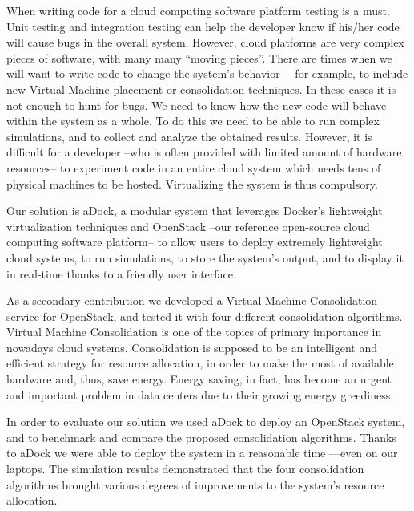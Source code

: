 \begin{spacing}{1}
When writing code for a cloud computing software platform testing is a must. Unit testing and integration testing can help the developer know if his/her code will cause bugs in the overall system. However, cloud platforms are very complex pieces of software, with many many ``moving pieces''. There are times when we will want to write code to change the system's behavior ---for example, to include new Virtual Machine placement or consolidation techniques. In these cases it is not enough to hunt for bugs. We need to know how the new code will behave within the system as a whole. To do this we need to be able to run complex simulations, and to collect and analyze the obtained results. However, it is difficult for a developer --who is often provided with limited amount of hardware resources-- to experiment code in an entire cloud system which needs tens of physical machines to be hosted. Virtualizing the system is thus compulsory.

Our solution is aDock, a modular system that leverages Docker's lightweight virtualization techniques and OpenStack --our reference open-source cloud computing software platform-- to allow users to deploy extremely lightweight cloud systems, to run simulations, to store the system's output, and to display it in real-time thanks to a friendly user interface.

As a secondary contribution we developed a Virtual Machine Consolidation service for OpenStack, and tested it with four different consolidation algorithms. Virtual Machine Consolidation is one of the topics of primary importance in nowadays cloud systems. Consolidation is supposed to be an intelligent and efficient strategy for resource allocation, in order to make the most of available hardware and, thus, save energy. Energy saving, in fact, has become an urgent and important problem in data centers due to their growing energy greediness.

In order to evaluate our solution we used aDock to deploy an OpenStack system, and to benchmark and compare the proposed consolidation algorithms. Thanks to aDock we were able to deploy the system in a reasonable time ---even on our laptops. The simulation results demonstrated that the four consolidation algorithms brought various degrees of improvements to the system's resource allocation.
\end{spacing}